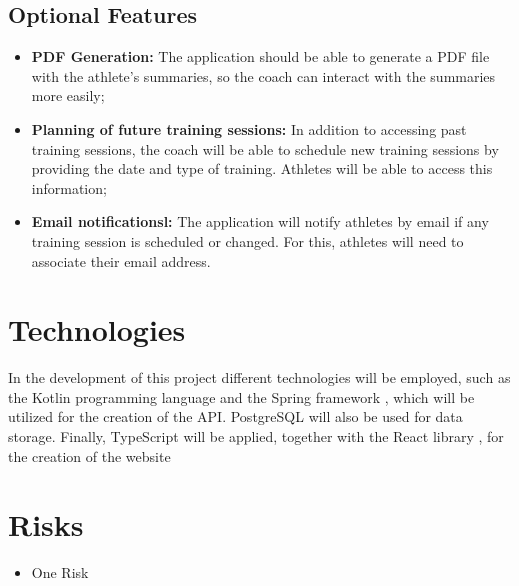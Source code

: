 \documentclass[a4paper,twoside,11pt]{article}
\begin{document}
\subsection{Optional Features}
\begin{itemize}
\item \textbf{PDF Generation:} The application should be able to generate a PDF file with the athlete's summaries, so the coach can interact with the summaries more easily;
\item \textbf{Planning of future training sessions:} In addition to accessing past training sessions, the coach will be able to schedule new training sessions by providing the date and type of training. Athletes will be able to access this information;
\item \textbf{Email notificationsl:} The application will notify athletes by email if any training session is scheduled or changed. For this, athletes will need to associate their email address.
\end{itemize}
\section{Technologies}
In the development of this project different technologies will be employed, such as the Kotlin programming language \cite{kotlin} and the Spring framework \cite{spring}, which will be utilized for the creation of the API. PostgreSQL \cite{postgresql} will also be used for data storage. Finally, TypeScript \cite{typescript} will be applied, together with the React library \cite{react}, for the creation of the website

\section{Risks}
\begin{itemize}
\item One Risk
\end{itemize}




\end{document}
